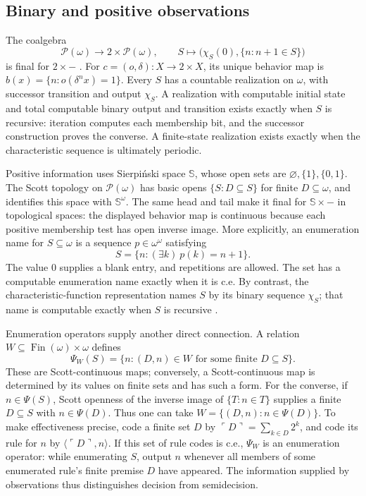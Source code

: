 \documentclass[11pt]{article}
\theoremstyle{definition}
\newcommand{\N}{\omega}
\begin{document}
\subsection{Binary and positive observations}
The coalgebra
\[
 \mathcal P(\N)\longrightarrow2\times\mathcal P(\N),\qquad
 S\longmapsto\bigl(\chi_S(0),\{n:n+1\in S\}\bigr)
\]
is final for $2\times-$ \cite[Corollary 2.3.6]{Jacobs}.
For $c=(o,\delta):X\to2\times X$, its unique behavior map is
$b(x)=\{n:o(\delta^n x)=1\}$. Every $S$ has a countable
realization on $\N$, with successor transition and output $\chi_S$.
A realization with computable initial state and total computable
binary output and transition exists exactly when $S$ is recursive:
iteration computes each membership bit, and the successor construction
proves the converse. A finite-state realization exists exactly when
the characteristic sequence is ultimately periodic.

Positive information uses Sierpi\'nski space $\mathbb S$, whose open
sets are $\varnothing,\{1\},\{0,1\}$. The Scott topology on
$\mathcal P(\N)$ has basic opens $\{S:D\subseteq S\}$ for finite
$D\subseteq\N$, and identifies this space with $\mathbb S^{\N}$.
The same head and tail make it final for $\mathbb S\times-$ in
topological spaces: the displayed behavior map is continuous because
each positive membership test has open inverse image.
More explicitly, an enumeration name for $S\subseteq\omega$ is a
sequence $p\in\omega^\omega$ satisfying
\[
 S=\{n:(\exists k)\ p(k)=n+1\}.
\]
The value $0$ supplies a blank entry, and repetitions are allowed.
The set has a computable enumeration name exactly when it is c.e.
By contrast, the characteristic-function representation names $S$
by its binary sequence $\chi_S$; that name is computable exactly
when $S$ is recursive \cite{Scott,Pauly}.

Enumeration operators supply another direct connection. A relation
$W\subseteq\operatorname{Fin}(\N)\times\N$ defines
\[
 \Psi_W(S)=\{n:(D,n)\in W\text{ for some finite }D\subseteq S\}.
\]
These are Scott-continuous maps; conversely, a Scott-continuous map
is determined by its values on finite sets and has such a form.
For the converse, if $n\in\Psi(S)$, Scott openness of the inverse
image of $\{T:n\in T\}$ supplies a finite $D\subseteq S$ with
$n\in\Psi(D)$. Thus one can take
$W=\{(D,n):n\in\Psi(D)\}$.
To make effectiveness precise, code a finite set $D$ by
$\ulcorner D\urcorner=\sum_{k\in D}2^k$, and code its rule for
$n$ by $\langle\ulcorner D\urcorner,n\rangle$.
If this set of rule codes is c.e., $\Psi_W$ is an enumeration
operator: while enumerating $S$, output $n$ whenever all members
of some enumerated rule's finite premise $D$ have appeared.
The information supplied by observations thus distinguishes decision
from semidecision.
\end{document}
